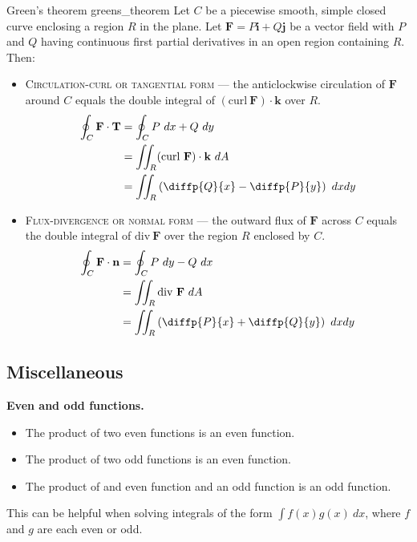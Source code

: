 \begin{theorem}{Green's theorem \cite{thomas_calculus}}{greens_theorem}
Let $C$ be a piecewise smooth, simple closed curve enclosing a region $R$ in the
plane. Let $\mathbf{F} = P \mathbf{i} + Q \mathbf{j}$ be a vector field with $P$ and $Q$ having continuous first partial derivatives in an open region containing $R$. Then:
\begin{itemize}
	\item \textsc{Circulation-curl or tangential form} --- the anticlockwise circulation of $\mathbf{F}$ around $C$ equals the double integral of $(\text{curl} \ \mathbf{F}) \cdot \mathbf{k}$ over $R$.
\begin{align*}
\oint_C \mathbf{F} \cdot \mathbf{T} &= \oint_C P \ dx + Q \ dy \\
&= \iint_R (\text{curl} \ \mathbf{F}) \cdot \mathbf{k} \ dA \\
&= \iint_R \left( \diffp{Q}{x} - \diffp{P}{y} \right) \ dx dy
\end{align*}
	\item \textsc{Flux-divergence or normal form} --- the outward flux of $\mathbf{F}$ across $C$ equals the double integral of $\text{div} \ \mathbf{F}$ over the region $R$ enclosed by $C$.
\begin{align*}
\oint_C \mathbf{F} \cdot \mathbf{n} &= \oint_C P \ dy - Q \ dx \\
&= \iint_R \text{div} \ \mathbf{F} \ dA \\
&= \iint_R \left( \diffp{P}{x} + \diffp{Q}{y} \right) \ dx dy
\end{align*}
\end{itemize}
\end{theorem}

\subsection{Miscellaneous}
\textbf{Even and odd functions.}
\begin{itemize}
	\item The product of two even functions is an even function.
	\item The product of two odd functions is an even function.
	\item The product of and even function and an odd function is an odd function.
\end{itemize}

This can be helpful when solving integrals of the form $\int f(x)g(x) \ dx$, where $f$ and $g$ are each even or odd.

